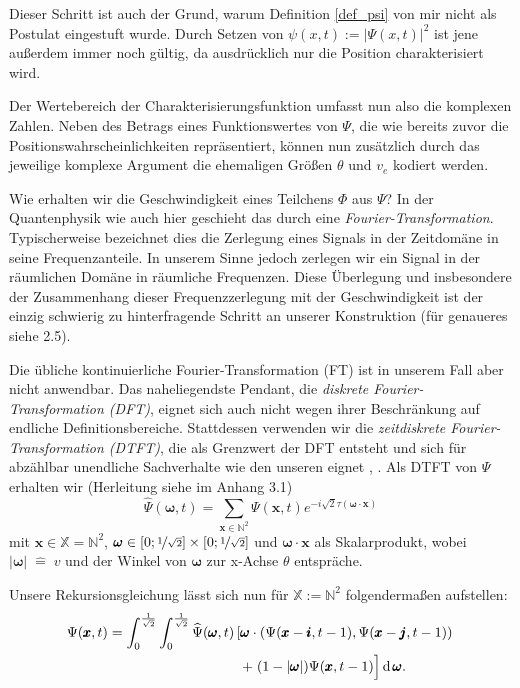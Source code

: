 \documentclass[a4paper,12pt,ngerman]{scrartcl}
\theoremstyle{plain}
\theoremstyle{plain}
\theoremstyle{plain}
\theoremstyle{plain}
\newcommand{\X}{\mathbb{X}}
\newcommand{\N}{\mathbb{N}}
\begin{document}
Dieser Schritt ist auch der Grund, warum Definition \ref{def_psi} von mir nicht als Postulat eingestuft wurde. Durch Setzen von $\psi(x,t):=|\Psi(x,t)|^2$ ist jene außerdem immer noch gültig, da ausdrücklich nur die Position charakterisiert wird.

Der Wertebereich der Charakterisierungsfunktion umfasst nun also die komplexen Zahlen. Neben des Betrags eines Funktionswertes von $\Psi$, die wie bereits zuvor die Positionswahrscheinlichkeiten repräsentiert, können nun zusätzlich durch das jeweilige komplexe Argument die ehemaligen Größen $\theta$ und $v_e$ kodiert werden.

Wie erhalten wir die Geschwindigkeit eines Teilchens $\Phi$ aus $\Psi$? In der Quantenphysik wie auch hier geschieht das durch eine \textit{Fourier-Transformation}. Typischerweise bezeichnet dies die Zerlegung eines Signals in der Zeitdomäne in seine Frequenzanteile. In unserem Sinne jedoch zerlegen wir ein Signal in der räumlichen Domäne in \glqq räumliche Frequenzen\grqq. Diese Überlegung und insbesondere der Zusammenhang dieser Frequenzzerlegung mit der Geschwindigkeit ist der einzig schwierig zu hinterfragende Schritt an unserer Konstruktion (für genaueres siehe 2.5).

Die übliche kontinuierliche Fourier-Transformation (FT) ist in unserem Fall aber nicht anwendbar. Das naheliegendste Pendant, die \textit{diskrete Fourier-Transformation (DFT)}, eignet sich auch nicht wegen ihrer Beschränkung auf endliche Definitionsbereiche. Stattdessen verwenden wir die \textit{zeitdiskrete Fourier-Transformation (DTFT)}, die als Grenzwert der DFT entsteht und sich für abzählbar unendliche Sachverhalte wie den unseren eignet \cite{wiki:dft}, \cite{wiki:dtft}. Als DTFT von $\Psi$ erhalten wir (Herleitung siehe im Anhang 3.1) 
\[\widehat{\Psi}(\pmb{\omega},t) = \sum_{\pmb{x}\in\mathbb{N}^2}\Psi(\pmb{x},t)e^{-i\sqrt{2}\tau(\pmb{\omega}\cdot\pmb{x})}\]
mit $\pmb{x}\in\X=\N^2$,\; $\pmb{\omega}\in[0;\nicefrac{1}{\sqrt{2}}]\times[0;\nicefrac{1}{\sqrt{2}}]$ und $\pmb{\omega}\cdot\pmb{x}$ als Skalarprodukt, wobei $|\pmb{\omega}|\;\widehat{=}\;v$ und der Winkel von $\pmb{\omega}$ zur x-Achse $\theta$ entspräche.

Unsere Rekursionsgleichung lässt sich nun für $\X:=\N^2$ folgendermaßen aufstellen:
\begin{align*}
\Psi(\pmb{x},t) = \int_0^{\frac{1}{\sqrt2}}\int_0^{\frac{1}{\sqrt2}} 
\widehat{\Psi}(\pmb{\omega},t)
&\left[
\pmb{\omega}\cdot\left(\Psi(\pmb{x}-\pmb{i},t-1),\Psi(\pmb{x}-\pmb{j},t-1)\right)
\right.\\
&\left.\;+\;(1-|\pmb{\omega}|)\Psi(\pmb{x},t-1)\vphantom{\hat{\Psi}}\right]
\operatorname{d}\pmb{\omega}. 
\end{align*}
\end{document}
